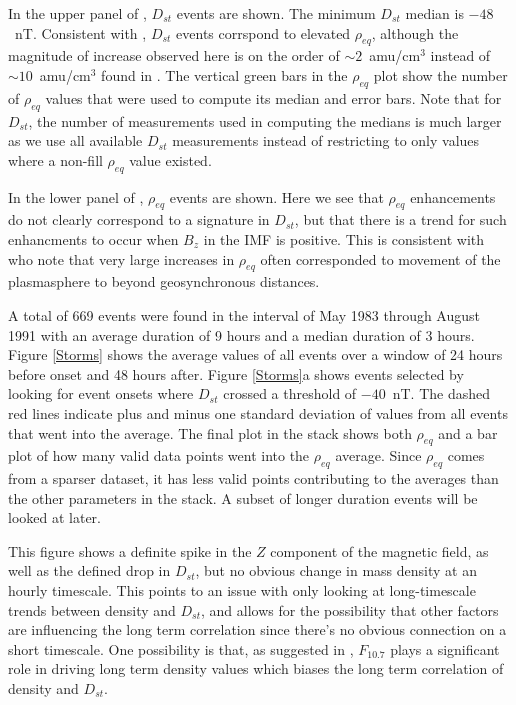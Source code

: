 \documentclass[10pt,twocolumn]{article}
\begin{document}
In the upper panel of \label{DailyAverages}, $D_{st}$ events are shown.  The minimum $D_{st}$ median is $-48$~nT.  Consistent with \cite{Takahashi2010}, $D_{st}$ events corrspond to elevated $\rho_{eq}$, although the magnitude of increase observed here is on the order of $\sim2$~amu/cm$^3$ instead of $\sim10$~amu/cm$^3$ found in \cite{Takahashi2010}.  The vertical green bars in the $\rho_{eq}$ plot show the number of $\rho_{eq}$ values that were used to compute its median and error bars.  Note that for $D_{st}$, the number of measurements used in computing the medians is much larger as we use all available $D_{st}$ measurements instead of restricting to only values where a non-fill $\rho_{eq}$ value existed.  

In the lower panel of \label{DailyAverages}, $\rho_{eq}$ events are shown.  Here we see that $\rho_{eq}$ enhancements do not clearly correspond to a signature in $D_{st}$, but that there is a trend for such enhancments to occur when $B_{z}$ in the IMF is positive.  This is consistent with \cite{Takahashi2010} who note that very large increases in $\rho_{eq}$ often corresponded to movement of the plasmasphere to beyond geosynchronous distances. 

A total of 669 events were found in the interval of May 1983 through August 1991 with an average duration of 9 hours and a median duration of 3 hours. Figure \ref{Storms} shows the average values of all events over a window of 24 hours before onset and 48 hours after. Figure \ref{Storms}a shows events selected by looking for event onsets where $D_{st}$ crossed a threshold of $-40$~nT. The dashed red lines indicate plus and minus one standard deviation of values from all events that went into the average. The final plot in the stack shows both $\rho_{eq}$ and a bar plot of how many valid data points went into the $\rho_{eq}$ average. Since $\rho_{eq}$ comes from a sparser dataset, it has less valid points contributing to the averages than the other parameters in the stack. A subset of longer duration events will be looked at later. 

This figure shows a definite spike in the $Z$ component of the magnetic field, as well as the defined drop in $D_{st}$, but no obvious change in mass density at an hourly timescale. This points to an issue with only looking at long-timescale trends between density and $D_{st}$, and allows for the possibility that other factors are influencing the long term correlation since there's no obvious connection on a short timescale. One possibility is that, as suggested in \cite{Takahashi2010}, $F_{10.7}$ plays a significant role in driving long term density values which biases the long term correlation of density and $D_{st}$.
\end{document}
